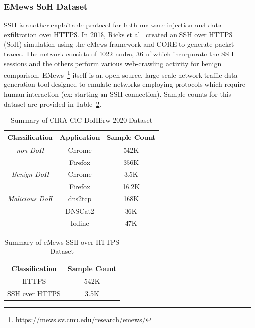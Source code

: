 \subsubsection{EMews SoH Dataset}
SSH is another exploitable protocol for both malware injection and data exfiltration over HTTPS. In 2018, Ricks et al~\cite{Ricks2018ddos} created an SSH over HTTPS (SoH) simulation using the eMews framework and CORE to generate packet traces. The network consists of 1022 nodes, 36 of which incorporate the SSH sessions and the others perform various web-crawling activity for benign comparison. EMews~\footnote{https://mews.sv.cmu.edu/research/emews/} itself is an open-source, large-scale network traffic data generation tool designed to emulate networks employing protocols which require human interaction (ex: starting an SSH connection). Sample counts for this dataset are provided in Table~\ref{tab:sohdataset}.

\begin{table} [ht!]
{
  \centering
  \begin{tabular}{|c|c|c|}
   \hline
   \textbf{Classification} & \textbf{Application} & \textbf{Sample Count} \\
   \hline
   \textit{non-DoH} & Chrome & 542K \\
    & Firefox & 356K \\
   \hline
   \textit{Benign DoH} & Chrome & 3.5K \\
    & Firefox & 16.2K \\
   \hline
   \textit{Malicious DoH} & dns2tcp & 168K \\
   & DNSCat2 & 36K \\
   & Iodine & 47K \\
   \hline
   \end{tabular}
  \caption{Summary of CIRA-CIC-DoHBrw-2020 Dataset}
  \label{tab:dohdataset}
}
\end{table}

\begin{table} [ht!]
{
  \centering
  \begin{tabular}{|c|c|}
   \hline
   \textbf{Classification} & \textbf{Sample Count} \\
   \hline
   HTTPS & 542K \\
   SSH over HTTPS & 3.5K \\
   \hline
   \end{tabular}
  \caption{Summary of eMews SSH over HTTPS Dataset}
  \label{tab:sohdataset}
}
\end{table}
